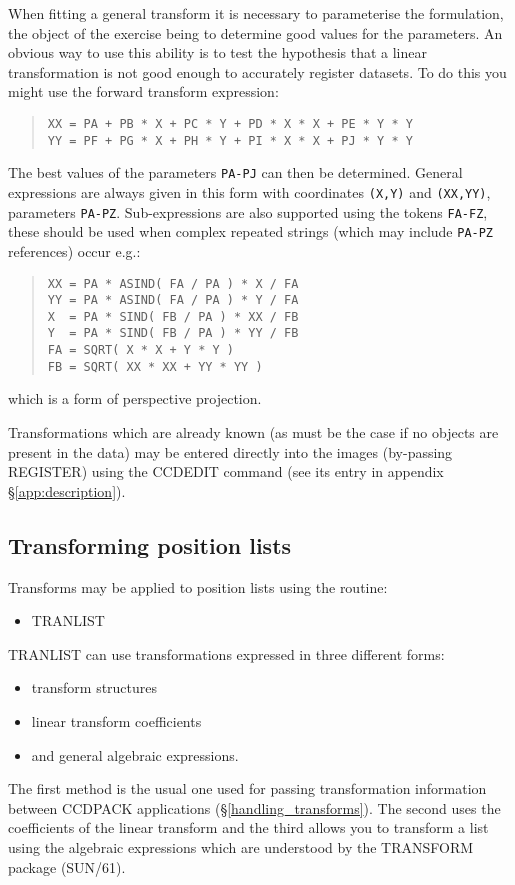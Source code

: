 \documentclass[twoside,11pt]{article}
\newcommand{\htmlref}[2]{#1}
\newcommand{\xref}[3]{#1}
\newcommand{\xlabel}[1]{}
\renewcommand{\_}{\texttt{\symbol{95}}}
\newenvironment{myquote}{\begin{quote}\begin{small}}{\end{small}\end{quote}}
\newcommand{\text}[1]{{\small \tt #1}}
\newcommand{\routine}[1]{{\sc #1}}
\newcommand{\xroutine}[1]{\htmlref{{\sc #1}}{#1}}
\begin{document}
When fitting a general transform it is necessary to parameterise the
formulation, the object of the exercise being to determine good values
for the parameters.
An obvious way to use this ability is to test the hypothesis that a
linear transformation is not good enough to accurately register
datasets.
To do this you might use the forward transform expression:
\begin{myquote}
\begin{verbatim}
XX = PA + PB * X + PC * Y + PD * X * X + PE * Y * Y
YY = PF + PG * X + PH * Y + PI * X * X + PJ * Y * Y
\end{verbatim}
\end{myquote}
The best values of the parameters \text{PA-PJ} can then be determined.
General expressions are always given in this form with coordinates
\text{(X,Y)} and \text{(XX,YY)}, parameters \text{PA-PZ}.
Sub-expressions are also supported using the tokens \text{FA-FZ}, these
should be used when complex repeated strings (which may include
\text{PA-PZ} references) occur e.g.:
\begin{myquote}
\begin{verbatim}
XX = PA * ASIND( FA / PA ) * X / FA
YY = PA * ASIND( FA / PA ) * Y / FA
X  = PA * SIND( FB / PA ) * XX / FB
Y  = PA * SIND( FB / PA ) * YY / FB
FA = SQRT( X * X + Y * Y )
FB = SQRT( XX * XX + YY * YY )
\end{verbatim}
\end{myquote}
which is a form of perspective projection.

Transformations which are already known (as must be the case if no
objects are present in the data) may be entered directly into the images
(by-passing \xroutine{REGISTER}) using the \xroutine{CCDEDIT} command
(see its entry in appendix \S\ref{app:description}).

\subsection{Transforming\xlabel{transformingpositions} position lists}
Transforms may be applied to position lists using the routine:
\begin{itemize}
\item \xroutine{TRANLIST}
\end{itemize}
\routine{TRANLIST} can use transformations expressed in three different forms:
\begin{itemize}
\item transform structures
\item linear transform coefficients
\item and general algebraic expressions.
\end{itemize}
The first method is the usual one used for passing transformation
information between CCDPACK applications (\S\ref{handling_transforms}).
The second uses the coefficients of the linear transform and the third
allows you to transform a list using the algebraic expressions which are
understood by the \xref{TRANSFORM package (SUN/61)}{sun61}{}.
\end{document}
